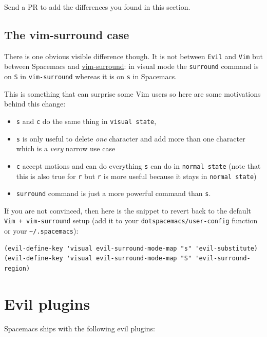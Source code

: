 \documentclass[11pt]{article}
\begin{document}
Send a PR to add the differences you found in this section.

\subsection{The vim-surround case}
\label{sec:orgb0b6265}
There is one obvious visible difference though. It is not between \texttt{Evil} and
\texttt{Vim} but between Spacemacs and \href{https://github.com/tpope/vim-surround}{vim-surround}: in visual mode the \texttt{surround} command is on \texttt{S}
in \texttt{vim-surround} whereas it is on \texttt{s} in Spacemacs.

This is something that can surprise some Vim users so here are some motivations
behind this change:
\begin{itemize}
\item \texttt{s} and \texttt{c} do the same thing in \texttt{visual state},
\item \texttt{s} is only useful to delete \emph{one} character and add more than one character
which is a \emph{very} narrow use case
\item \texttt{c} accept motions and can do everything \texttt{s} can do in \texttt{normal state}
(note that this is also true for \texttt{r} but \texttt{r} is more useful because it
stays in \texttt{normal state})
\item \texttt{surround} command is just a more powerful command than \texttt{s}.
\end{itemize}

If you are not convinced, then here is the snippet to revert back to the default
\texttt{Vim + vim-surround} setup (add it to your \texttt{dotspacemacs/user-config} function or
your \texttt{\textasciitilde{}/.spacemacs}):

\begin{verbatim}
(evil-define-key 'visual evil-surround-mode-map "s" 'evil-substitute)
(evil-define-key 'visual evil-surround-mode-map "S" 'evil-surround-region)
\end{verbatim}

\section{Evil plugins}
\label{sec:org367bb0f}
Spacemacs ships with the following evil plugins:
\end{document}
